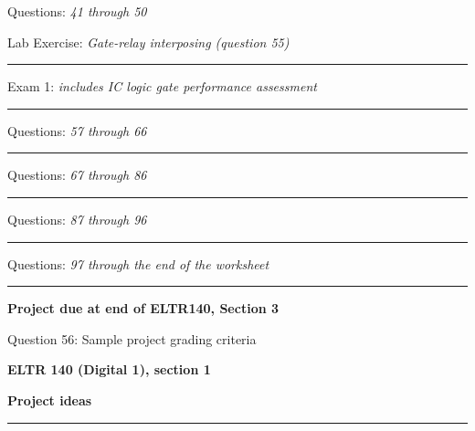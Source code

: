 \hskip 10pt Questions: {\it 41 through 50}
 
\hskip 10pt Lab Exercise: {\it Gate-relay interposing (question 55)}
 


\vskip 10pt
\hrule \vskip 5pt
\noindent
{}

\hskip 10pt Exam 1: {\it includes IC logic gate performance assessment}
 
\vskip 10pt
\hrule \vskip 5pt
\noindent
{}

\hskip 10pt Questions: {\it 57 through 66}
 
\vskip 10pt
\hrule \vskip 5pt
\noindent
{}

\hskip 10pt Questions: {\it 67 through 86}
 
\vskip 10pt
\hrule \vskip 5pt
\noindent
{}

\hskip 10pt Questions: {\it 87 through 96}
 
\vskip 10pt
\hrule \vskip 5pt
\noindent
{}

\hskip 10pt Questions: {\it 97 through the end of the worksheet}
 
\vskip 10pt
\hrule \vskip 5pt
\noindent
{}

\hskip 10pt {\bf Project due at end of ELTR140, Section 3}
 
\hskip 10pt Question 56: Sample project grading criteria
 
\vskip 10pt









\vfil \eject

\centerline{\bf ELTR 140 (Digital 1), section 1} \bigskip 
 
\vskip 10pt

\noindent
{\bf Project ideas}

\vskip 5pt

\hrule \vskip 5pt


